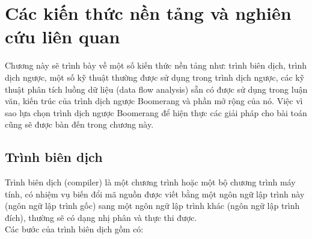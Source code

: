 \chapter{Các kiến thức nền tảng và nghiên cứu liên quan}
Chương này sẽ trình bày về một số kiến thức nền tảng như: trình biên dịch, trình dịch ngược, một số kỹ thuật thường được sử dụng trong trình dịch ngược, các kỹ thuật phân tích luồng dữ liệu (data flow analysis) sẵn có được sử dụng trong luận văn, kiến trúc của trình dịch ngược Boomerang và phần mở rộng của nó. Việc vì sao lựa chọn trình dịch ngược Boomerang để hiện thực các giải pháp cho bài toán cũng sẽ được bàn đến trong chương này. \\
\section{Trình biên dịch}
Trình biên dịch (compiler) \cite{compiler} là một chương trình hoặc một bộ chương trình máy tính, có nhiệm vụ biến đổi mã nguồn được viết bằng một ngôn ngữ lập trình này (ngôn ngữ lập trình gốc) sang một ngôn ngữ lập trình khác (ngôn ngữ lập trình đích), thường sẽ có dạng nhị phân và thực thi được. \\
Các bước của trình biên dịch gồm có:

